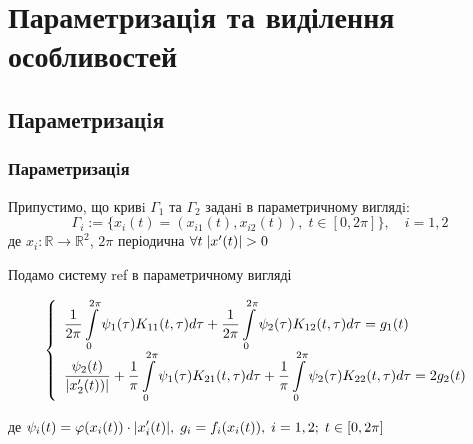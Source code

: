\documentclass{beamer}
\numberwithin{equation}{section}
\newcommand{\intl}{\int\limits}
\newcommand{\inttwopi}{\intl_{0}^{2\pi}}
\begin{document}
	\section{Параметризацiя та виділення особливостей} 
	

	\subsection{Параметризацiя} 

	\begin{frame}
		\frametitle{Параметризацiя}
		Припустимо, що кривi $\Gamma_{1}$ та $\Gamma_{2}$ заданi в параметричному виглядi:
		\begin{equation}
			\Gamma_{i} := \{ x_{i}(t) = (x_{i1}(t), x_{i2}(t)), \; t \in [ 0, 2\pi ] \} , \quad i = 1, 2
		\end{equation}
		\indent де $x_{i} : \mathbb{R} \rightarrow \mathbb{R}^2$, $2\pi$ періодична $\forall{t} \; \abs{x'(t)} > 0$ 
		
		Подамо систему ref в параметричному вигляді
		\begin{small}
			\begin{equation}
				\label{IE-parametrized-system}
				\left\{
				\begin{array}{l}
					\displaystyle
					\frac{1}{2\pi} \inttwopi \psi_1(\tau) K_{11}(t, \tau) d \tau
					+ \frac{1}{2\pi} \inttwopi  \psi_2(\tau) K_{12}(t, \tau) d \tau
					= g_{1}(t)
					\\ [0.3cm]
					\displaystyle
					 \frac{\psi_2(t)}{\abs{x'_{2}(t))}}
					+ \frac{1}{\pi} \inttwopi \psi_1(\tau) K_{21}(t, \tau) d \tau
					+ \frac{1}{\pi} \inttwopi  \psi_2(\tau) K_{22}(t, \tau) d \tau
					= 2g_{2}(t)
				\end{array}\right.
			\end{equation}
		
		де $\displaystyle \psi_{i}(t) = \varphi(x_{i}(t)) \cdot \abs{x'_{i}(t)}, \; g_{i} = f_{i}(x_{i}(t)), \;  i  = 1, 2; \; t \in [0, 2\pi]$ \\[0.3cm]
		
		\end{small}
	\end{frame}
	
		
\end{document}

